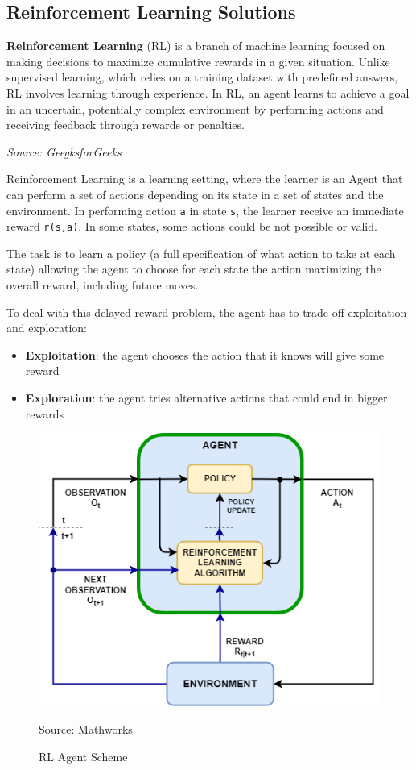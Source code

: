 \subsection{Reinforcement Learning Solutions}
\begin{blockquote}
  \textbf{Reinforcement Learning} (RL) is a branch of machine learning focused
  on making decisions to maximize cumulative rewards in a given situation. Unlike
  supervised learning, which relies on a training dataset with predefined
  answers, RL involves learning through experience. In RL, an agent learns to achieve
  a goal in an uncertain, potentially complex environment by performing actions
  and receiving feedback through rewards or penalties.

  \emph{Source: GeegksforGeeks \footnotemark}
\end{blockquote}

Reinforcement Learning is a learning setting, where the learner is an Agent that
can perform a set of actions depending on its state in a set of states and the environment.
In performing action \texttt{a} in state \texttt{s}, the learner receive an immediate
reward \texttt{r(s,a)}. In some states, some actions could be not possible or
valid.

The task is to learn a policy (a full specification of what action to take at each
state) allowing the agent to choose for each state the action maximizing the
overall reward, including future moves.

To deal with this delayed reward problem, the agent has to trade-off
exploitation and exploration:
\begin{itemize}
  \item \textbf{Exploitation}: the agent chooses the action that it knows will give
    some reward

  \item \textbf{Exploration}: the agent tries alternative actions that could end
    in bigger rewards
\end{itemize}

\begin{figure}[h!]
  \centering
  \includegraphics[width=.42\textwidth]{images/rl_scheme.png}
  \caption{RL Agent Scheme}
  {Source: Mathworks\footnotemark} \label{fig:rl_scheme}
\end{figure}


